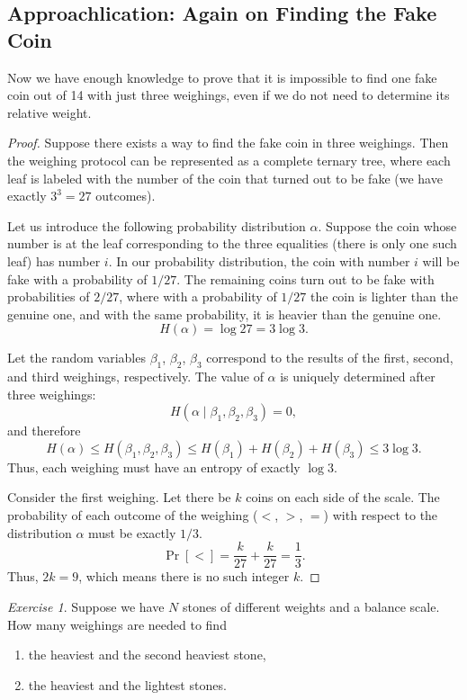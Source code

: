 \documentclass[12pt,sans]{article}
\theoremstyle{definition}
\theoremstyle{plain}
\theoremstyle{remark}
\newtheorem{exercise}{Exercise}[section]
\begin{document}
\subsection{Approachlication: Again on Finding the Fake Coin}
Now we have enough knowledge to prove that it is impossible to find one fake coin out of 14 with just three weighings, even if we do not need to determine its relative weight.

\begin{proof}
    Suppose there exists a way to find the fake coin in three weighings. Then the weighing protocol can be represented as a complete ternary tree, where each leaf is labeled with the number of the coin that turned out to be fake (we have exactly \(3^3 = 27\) outcomes).

    Let us introduce the following probability distribution \(\alpha\). Suppose the coin whose number is at the leaf corresponding to the three equalities (there is only one such leaf) has number \(i\). In our probability distribution, the coin with number \(i\) will be fake with a probability of \(1/27\). The remaining coins turn out to be fake with probabilities of \(2/27\), where with a probability of \(1/27\) the coin is lighter than the genuine one, and with the same probability, it is heavier than the genuine one.
    \[
    H(\alpha) = \log 27 = 3\log 3.
    \]

    Let the random variables \(\beta_1\), \(\beta_2\), \(\beta_3\) correspond to the results of the first, second, and third weighings, respectively. The value of \(\alpha\) is uniquely determined after three weighings:
    \[
    H(\alpha\mid\beta_1,\beta_2,\beta_3) = 0,
    \]
    and therefore
    \[
    H(\alpha) \le H(\beta_1,\beta_2,\beta_3) \le H(\beta_1) + H(\beta_2) + H(\beta_3) \le 3\log 3.
    \]
    Thus, each weighing must have an entropy of exactly \(\log 3\).

    Consider the first weighing. Let there be \(k\) coins on each side of the scale. The probability of each outcome of the weighing (\(<\), \(>\), \(=\)) with respect to the distribution \(\alpha\) must be exactly \(1/3\).
    \[
    \Pr[<] = \frac{k}{27} + \frac{k}{27} = \frac{1}{3}.
    \]
    Thus, \(2k = 9\), which means there is no such integer \(k\).
\end{proof}

\begin{exercise}
    Suppose we have \(N\) stones of different weights and a balance scale. How many weighings are needed to find
    \begin{enumerate}
        \item the heaviest and the second heaviest stone,
        \item the heaviest and the lightest stones.
    \end{enumerate}
\end{exercise}
\end{document}
